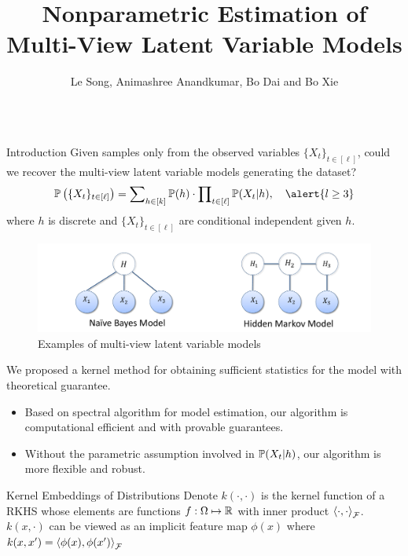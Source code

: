 \documentclass[final,t]{beamer}
\title{\huge Nonparametric Estimation of Multi-View Latent Variable Models}
\author{Le Song, Animashree Anandkumar, Bo Dai and Bo Xie}
\institute[gt_cse]{Georgia Institute of Technology, University of California Irvine}
\begin{document}
\begin{frame}{} 
  \begin{columns}[t]
    \begin{column}{.3\linewidth}


      \begin{block}{Introduction}
        Given samples only from the \alert{observed variables} $\{X_t\}_{t\in[\ell] }$, could we recover the multi-view latent variable models generating the dataset?
        \begin{eqnarray*}
        \PP\rbr{\{X_t\}_{t \in [\ell]}}=\sum\nolimits_{h \in [k]} \PP(h) \cdot \prod\nolimits_{t \in [\ell]} \PP(X_t|h),\quad \alert{l\ge 3}
        \end{eqnarray*}
        where $h$ is \alert{discrete} and $\{X_t\}_{t\in[\ell] }$ are \alert{conditional independent} given $h$.
        \begin{figure}[h!]
        \centering
        \includegraphics[width=\linewidth]{figures/example_mv.pdf} 
        \caption{Examples of multi-view latent variable models}
        \end{figure}
        
        We proposed a \alert{kernel} method for obtaining sufficient statistics for the model with \alert{theoretical guarantee}.
        \begin{itemize}
        \item Based on spectral algorithm for model estimation, our algorithm is \alert{computational efficient} and with \alert{provable guarantees}.
        \item \alert{Without the parametric assumption} involved in $\mathbb{P}(X_t|h)$, our algorithm is more flexible and robust.
        \end{itemize}
      \end{block}
      \vspace{-0.5in}
      \begin{block}{Kernel Embeddings of Distributions}
        Denote $k(\cdot, \cdot)$ is the kernel function of a RKHS whose elements are functions $f:\Omega \mapsto \mathbb{R}$ with
        inner product $\left\langle \cdot,\cdot \right\rangle_{\mathcal{F}}$. $k(x,\cdot)$ can be
        viewed as an implicit feature map $\phi(x)$ where $k(x, x') =
        \left\langle \phi(x),\phi(x') \right\rangle_{\mathcal{F}}$


\end{block}
\end{column}
\end{columns}
\end{frame}
\end{document}
